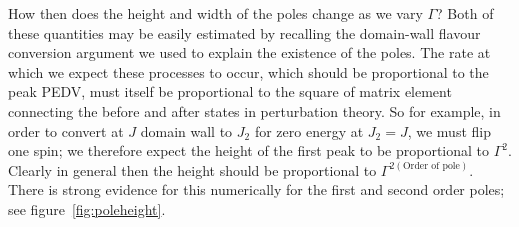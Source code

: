 \documentclass [a4paper, 11pt]{article}
\begin{document}
How then does the height and width of the poles change as we vary $\Gamma$? Both of these quantities may be easily estimated by recalling the domain-wall flavour conversion argument we used to explain the existence of the poles. The rate at which we expect these processes to occur, which should be proportional to the peak PEDV, must itself be proportional to the square of matrix element connecting the before and after states in perturbation theory. So for example, in order to convert at $J$ domain wall to $J_2$ for zero energy at $J_2 = J$, we must flip one spin; we therefore expect the height of the first peak to be proportional to $\Gamma^2$. Clearly in general then the height should be proportional to $\Gamma^{2 (\text{Order of pole})}$. There is strong evidence for this numerically for the first and second order poles; see figure~\ref{fig:poleheight}.
\end{document}
